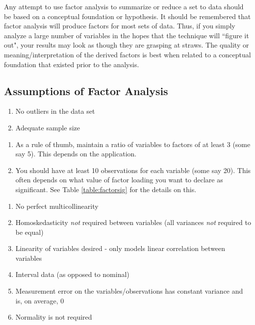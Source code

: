 \documentclass[
]{article}
\providecommand{\tightlist}{%
  \setlength{\itemsep}{0pt}\setlength{\parskip}{0pt}}
\theoremstyle{definition}
\theoremstyle{definition}
\theoremstyle{definition}
\theoremstyle{definition}
\theoremstyle{remark}
\begin{document}
Any attempt to use factor analysis to summarize or reduce a set to data should be based on a conceptual foundation or hypothesis. It should be remembered that factor analysis will produce factors for most sets of data. Thus, if you simply analyze a large number of variables in the hopes that the technique will ``figure it out", your results may look as though they are grasping at straws. The quality or meaning/interpretation of the derived factors is best when related to a conceptual foundation that existed prior to the analysis.

\hypertarget{assumptions-of-factor-analysis}{%
\subsection{Assumptions of Factor Analysis}\label{assumptions-of-factor-analysis}}

\begin{enumerate}
\def\labelenumi{\arabic{enumi}.}
\tightlist
\item
  No outliers in the data set
\item
  Adequate sample size
\end{enumerate}

\begin{enumerate}
\def\labelenumi{\alph{enumi}.}
\tightlist
\item
  As a rule of thumb, maintain a ratio of variables to factors of at least 3 (some say 5). This depends on the application.
\item
  You should have at least 10 observations for each variable (some say 20). This often depends on what value of factor loading you want to declare as significant. See Table \ref{table:factorsig} for the details on this.
\end{enumerate}

\begin{enumerate}
\def\labelenumi{\arabic{enumi}.}
\setcounter{enumi}{2}
\tightlist
\item
  No perfect multicollinearity
\item
  Homoskedasticity \emph{not} required between variables (all variances \emph{not} required to be equal)
\item
  Linearity of variables desired - only models linear correlation between variables
\item
  Interval data (as opposed to nominal)
\item
  Measurement error on the variables/observations has constant variance and is, on average, 0
\item
  Normality is not required
\end{enumerate}
\end{document}
